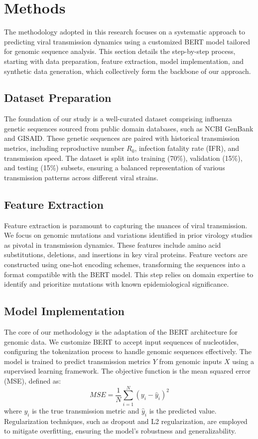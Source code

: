 \documentclass{article}
\begin{document}
\section{Methods}
The methodology adopted in this research focuses on a systematic approach to predicting viral transmission dynamics using a customized BERT model tailored for genomic sequence analysis. This section details the step-by-step process, starting with data preparation, feature extraction, model implementation, and synthetic data generation, which collectively form the backbone of our approach.

\subsection*{Dataset Preparation}
The foundation of our study is a well-curated dataset comprising influenza genetic sequences sourced from public domain databases, such as NCBI GenBank and GISAID. These genetic sequences are paired with historical transmission metrics, including reproductive number \( R_0 \), infection fatality rate (IFR), and transmission speed. The dataset is split into training (70\%), validation (15\%), and testing (15\%) subsets, ensuring a balanced representation of various transmission patterns across different viral strains.

\subsection*{Feature Extraction}
Feature extraction is paramount to capturing the nuances of viral transmission. We focus on genomic mutations and variations identified in prior virology studies as pivotal in transmission dynamics. These features include amino acid substitutions, deletions, and insertions in key viral proteins. Feature vectors are constructed using one-hot encoding schemes, transforming the sequences into a format compatible with the BERT model. This step relies on domain expertise to identify and prioritize mutations with known epidemiological significance.

\subsection*{Model Implementation}
The core of our methodology is the adaptation of the BERT architecture for genomic data. We customize BERT to accept input sequences of nucleotides, configuring the tokenization process to handle genomic sequences effectively. The model is trained to predict transmission metrics \( Y \) from genomic inputs \( X \) using a supervised learning framework. The objective function is the mean squared error (MSE), defined as:
\[
MSE = \frac{1}{N} \sum_{i=1}^{N} (y_i - \hat{y}_i)^2
\]
where \( y_i \) is the true transmission metric and \( \hat{y}_i \) is the predicted value. Regularization techniques, such as dropout and L2 regularization, are employed to mitigate overfitting, ensuring the model's robustness and generalizability.
\end{document}
